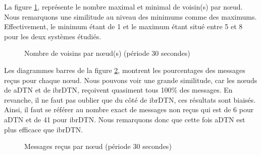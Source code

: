 \documentclass[a4paper,10pt]{article}
\begin{document}
La figure \ref{fig:30_nb_neighbors}, représente le nombre maximal et minimal de voisin(s) par nœud. Nous remarquons une similitude au niveau des minimums comme des maximums. Effectivement, le minimum étant de 1 et le maximum étant situé entre 5 et 8 pour les deux systèmes étudiés.\par

\begin{figure}[h!]
    \centering
    \caption{Nombre de voisins par nœud(s) (période 30 secondes)}
    \label{fig:30_nb_neighbors}
\end{figure}

Les diagrammes barres de la figure \ref{fig:30_msg_rcv}, montrent les pourcentages des messages reçus pour chaque nœud. Nous pouvons voir une grande similitude, car les nœuds de aDTN et de ibrDTN, reçoivent quasiment tous 100\% des messages. En revanche, il ne faut pas oublier que du côté de ibrDTN, ces résultats sont biaisés. Ainsi, il faut se référer au nombre exact de messages non reçus qui est de 6 pour aDTN et de 41 pour ibrDTN. Nous remarquons donc que cette fois aDTN est plus efficace que ibrDTN.\par

\begin{figure}[h!]
    \centering
    \caption{Messages reçus par nœud (période 30 secondes)}
    \label{fig:30_msg_rcv}
\end{figure}
\end{document}
